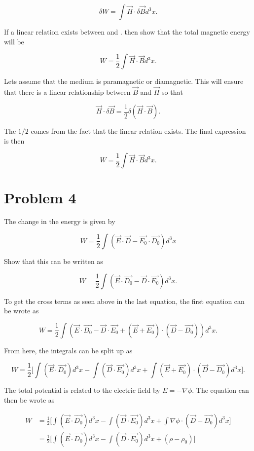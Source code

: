 \documentclass[11pt]{article}
\begin{document}
$$
\delta W = \int \vec{H} \cdot \delta \vec{B} d^{3}x.
$$

If a linear relation exists between  and . then show that the total magnetic energy will be

$$
W = \frac{1}{2} \int \vec{H} \cdot \vec{B} d^{3}x.
$$

Lets assume that the medium is paramagnetic  or diamagnetic. This will ensure that there is a linear relationship between $\vec{B}$ and $\vec{H}$ so that 

$$
\vec{H} \cdot \delta \vec{B} = \frac{1}{2}\delta(\vec{H} \cdot \vec{B}).
$$

The $1/2$ comes from the fact that the linear relation exists. The final expression is then

$$
W = \frac{1}{2} \int \vec{H} \cdot \vec{B} d^{3}x.
$$

\clearpage

\section*{Problem 4}

The change in the energy is given by 

$$
W = \frac{1}{2} \int (\vec{E} \cdot \vec{D} - \vec{E_{0}} \cdot \vec{D_{0}}) d^{3}x
$$

Show that this can be written as

$$
W = \frac{1}{2} \int (\vec{E} \cdot \vec{D_{0}} - \vec{D} \cdot \vec{E_{0}}) d^{3}x.
$$

To get the cross terms as seen above in the last equation, the first equation can be wrote as 

$$
W = \frac{1}{2} \int (\vec{E} \cdot \vec{D_{0}}  - \vec{D} \cdot \vec{E_{0}}  + (\vec{E} + \vec{E_{0}}) \cdot (\vec{D} - \vec{D_{0}})) d^{3}x.
$$

From here, the integrals can be split up as

$$
W = \frac{1}{2} \Bigg[ \int (\vec{E} \cdot \vec{D_{0}}) d^{3}x - \int (\vec{D} \cdot \vec{E_{0}}) d^{3}x + \int (\vec{E} + \vec{E_{0}}) \cdot (\vec{D} - \vec{D_{0}}) d^{3}x \Bigg].
$$

The total potential is related to the electric field by $E = - \nabla \phi$. The equation can then be wrote as

\begin{align*}
W &= \frac{1}{2} \Bigg[ \int (\vec{E} \cdot \vec{D_{0}}) d^{3}x - \int (\vec{D} \cdot \vec{E_{0}}) d^{3}x + \int \nabla \phi \cdot (\vec{D} - \vec{D_{0}}) d^{3}x \Bigg] \\
&= \frac{1}{2} \Bigg[ \int (\vec{E} \cdot \vec{D_{0}}) d^{3}x - \int (\vec{D} \cdot \vec{E_{0}}) d^{3}x + (\rho - \rho_{0}) \Bigg] \\
\end{align*}
\end{document}
